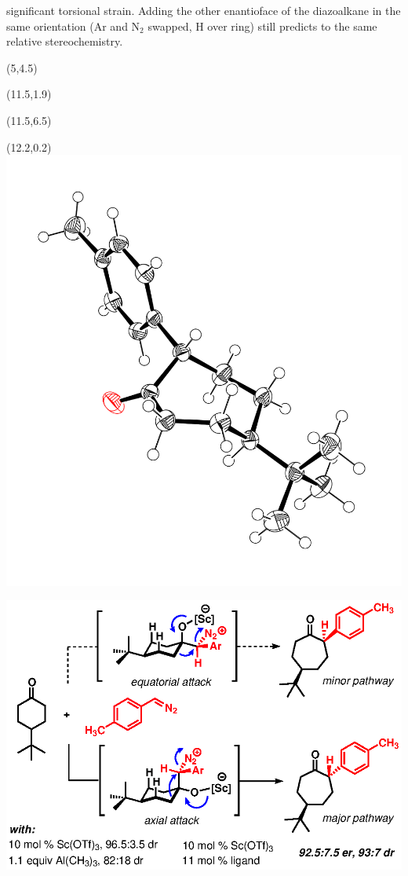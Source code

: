 significant torsional strain. Adding the other enantioface of the diazoalkane in the same orientation (Ar and N$_2$ swapped, H over ring) still predicts to the same relative stereochemistry. \begin{Scheme}[t]
 \begin{textblock}{1}(5,4.5)  \end{textblock}
 \begin{textblock}{1}(11.5,1.9)  \end{textblock}
  \begin{textblock}{1}(11.5,6.5)  \end{textblock}
   \begin{textblock}{1}(12.2,0.2)
   \includegraphics[scale=0.35]{chp_asymmetric/images/xray/xaax_nolabels} \end{textblock}
  \includegraphics[scale=0.8]{chp_asymmetric/images/diastereoselective}
  \caption{Diastereo-- and enantioselective insertion reactions with
  4-\textit{tert}-butylcyclohexanone.}
  \label{sch:asdiastereoselective}
\end{Scheme}

